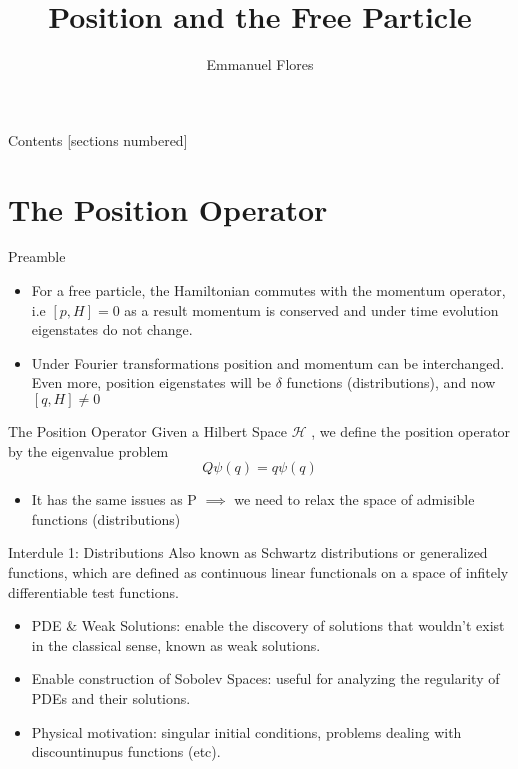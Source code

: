 \documentclass[12pt]{beamer}
\title{Position and the Free Particle}
\author{Emmanuel Flores}
\institute{Advanced Mathematical Methods, \\Tufts University}
\begin{document}
\maketitle
\begin{frame}{Contents}
	[sections numbered]
	\tableofcontents
\end{frame}
\section[The Position Operator]{The Position Operator}
\begin{frame}{Preamble}
\begin{itemize}
	\item For a free particle, the Hamiltonian commutes with the momentum operator, i.e $[p,H] = 0$ as a result momentum is conserved and under time evolution eigenstates do not change.
	\item Under Fourier transformations position and momentum can be interchanged. Even more, position eigenstates will be $\delta$ functions (distributions), and now $[q,H]\neq0$
\end{itemize}
\end{frame}
\begin{frame}{The Position Operator}
Given a Hilbert Space $\mathcal{H}$	, we define the position operator by the eigenvalue problem
\begin{displaymath}
Q\psi(q) = q\psi(q)  
\end{displaymath}
\begin{itemize}
	\item It has the same issues as P $\implies $ we need to relax the space of admisible functions (distributions)
\end{itemize}
\end{frame}
\begin{frame}{Interdule 1: Distributions}
Also known as Schwartz distributions or generalized functions, which are defined as continuous linear functionals on a space of infitely differentiable test functions.
\begin{itemize}
	\item PDE \& Weak Solutions: enable the discovery of solutions that wouldn't exist in the classical sense, known as weak solutions.
	\item Enable construction of Sobolev Spaces: useful for analyzing the regularity of PDEs and their solutions.
	\item Physical motivation: singular initial conditions, problems dealing with discountinupus functions (etc).
\end{itemize}
\end{frame}
\end{document}
